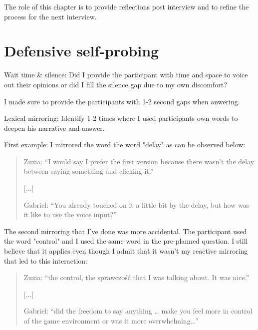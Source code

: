
The role of this chapter is to provide reflections post interview and to refine the process for the next interview.

\section{Defensive self-probing}

\begin{QandA}
   \item Wait time \& silence: Did I provide the participant with time and space to voice out their opinions or did I fill the silence gap due to my own discomfort?
        \begin{answered}
            I made sure to provide the participants with 1-2 second gaps when anwering.
        \end{answered}

   \item Lexical mirroring: Identify 1-2 times where I used participants own words to deepen his narrative and answer.

        \begin{answered}
        First example: I mirrored the word the word "delay" as can be observed below:
        \begin{quote}
            Zuzia: “I would say I prefer the first version because there wasn't the delay between saying something and clicking it.”
            
            
            [...]


            Gabriel: “You already touched on it a little bit by the delay, but how was it like to use the voice input?”
        \end{quote}


        The second mirroring that I've done was more accidental. The participant used the word "control" and I used the same word in the pre-planned question. I still believe that it applies even though I admit that it wasn't my reactive mirroring that led to this interaction:

        \begin{quote}
            Zuzia: “the control, the sprawczość that I was talking about. It was nice.”

            [...]

            Gabriel: “did the freedom to say anything … make you feel more in control of the game environment or was it more overwhelming…”
        \end{quote}
        \end{answered}


\end{QandA}
